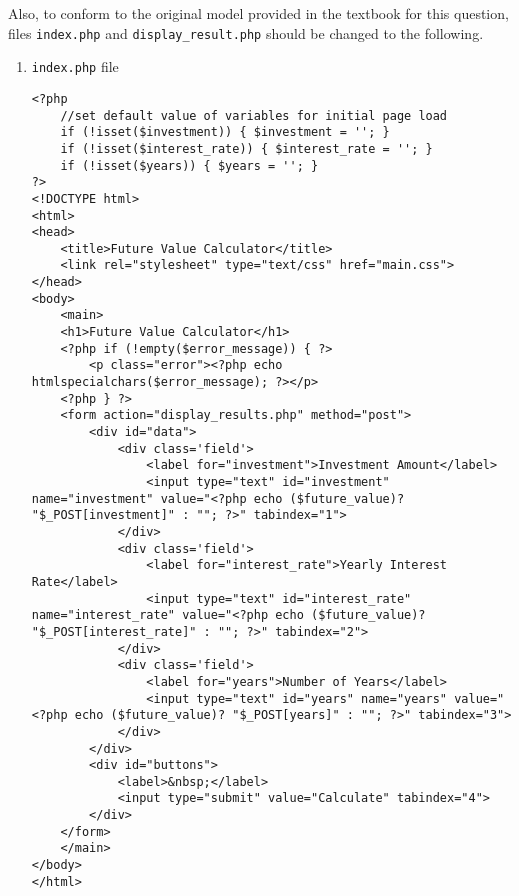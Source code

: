 Also, to conform to the original model provided in the textbook for this question, files \texttt{index.php} and \texttt{display\_result.php} should be changed to the following.

\begin{enumerate}
\item \texttt{index.php} file
\lstset{language=php,tabsize=2}
\begin{lstlisting}
<?php 
	//set default value of variables for initial page load
	if (!isset($investment)) { $investment = ''; } 
	if (!isset($interest_rate)) { $interest_rate = ''; } 
	if (!isset($years)) { $years = ''; } 
?> 
<!DOCTYPE html>
<html>
<head>
	<title>Future Value Calculator</title>
	<link rel="stylesheet" type="text/css" href="main.css">
</head>
<body>
	<main>
	<h1>Future Value Calculator</h1>
	<?php if (!empty($error_message)) { ?>
		<p class="error"><?php echo htmlspecialchars($error_message); ?></p>
	<?php } ?>
	<form action="display_results.php" method="post">
		<div id="data">
			<div class='field'>
				<label for="investment">Investment Amount</label>
				<input type="text" id="investment" name="investment" value="<?php echo ($future_value)? "$_POST[investment]" : ""; ?>" tabindex="1">
			</div>
			<div class='field'>
				<label for="interest_rate">Yearly Interest Rate</label>
				<input type="text" id="interest_rate" name="interest_rate" value="<?php echo ($future_value)? "$_POST[interest_rate]" : ""; ?>" tabindex="2">
			</div>
			<div class='field'>
				<label for="years">Number of Years</label>
				<input type="text" id="years" name="years" value="<?php echo ($future_value)? "$_POST[years]" : ""; ?>" tabindex="3">
			</div>
		</div>
		<div id="buttons">
			<label>&nbsp;</label>
			<input type="submit" value="Calculate" tabindex="4">
		</div>
	</form>
	</main>
</body>
</html>
\end{lstlisting}


\end{enumerate}
